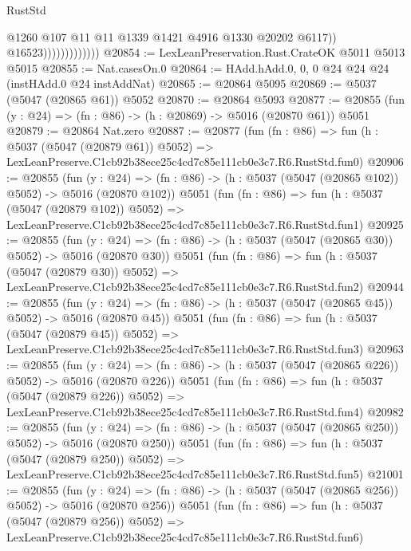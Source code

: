 \begin{lexlean}{RustStd}
\begin{coremodule}
                                  @1260
                                  @107
                                  @11
                                  @11
                                  @1339
                                  @1421
                                  @4916
                                  @1330
                                  @20202
                                  @6117))
                              @16523)))))))))))))
@20854 := LexLeanPreservation.Rust.CrateOK @5011 @5013 @5015
@20855 := Nat.casesOn.{0}
@20864 := HAdd.hAdd.{0, 0, 0} @24 @24 @24 (instHAdd.{0} @24 instAddNat)
@20865 := @20864 @5095
@20869 := @5037 (@5047 (@20865 @61)) @5052
@20870 := @20864 @5093
@20877 := @20855 (fun (y : @24) => (fn : @86) -> (h : @20869) -> @5016 (@20870 @61)) @5051
@20879 := @20864 Nat.zero
@20887 := @20877
    (fun (fn : @86) =>
    fun (h : @5037 (@5047 (@20879 @61)) @5052) =>
    LexLeanPreserve.C1cb92b38ece25c4cd7c85e111cb0e3c7.R6.RustStd.fun0)
@20906 := @20855
    (fun (y : @24) => (fn : @86) -> (h : @5037 (@5047 (@20865 @102)) @5052) -> @5016 (@20870 @102))
    @5051
    (fun (fn : @86) =>
    fun (h : @5037 (@5047 (@20879 @102)) @5052) =>
    LexLeanPreserve.C1cb92b38ece25c4cd7c85e111cb0e3c7.R6.RustStd.fun1)
@20925 := @20855
    (fun (y : @24) => (fn : @86) -> (h : @5037 (@5047 (@20865 @30)) @5052) -> @5016 (@20870 @30))
    @5051
    (fun (fn : @86) =>
    fun (h : @5037 (@5047 (@20879 @30)) @5052) =>
    LexLeanPreserve.C1cb92b38ece25c4cd7c85e111cb0e3c7.R6.RustStd.fun2)
@20944 := @20855
    (fun (y : @24) => (fn : @86) -> (h : @5037 (@5047 (@20865 @45)) @5052) -> @5016 (@20870 @45))
    @5051
    (fun (fn : @86) =>
    fun (h : @5037 (@5047 (@20879 @45)) @5052) =>
    LexLeanPreserve.C1cb92b38ece25c4cd7c85e111cb0e3c7.R6.RustStd.fun3)
@20963 := @20855
    (fun (y : @24) => (fn : @86) -> (h : @5037 (@5047 (@20865 @226)) @5052) -> @5016 (@20870 @226))
    @5051
    (fun (fn : @86) =>
    fun (h : @5037 (@5047 (@20879 @226)) @5052) =>
    LexLeanPreserve.C1cb92b38ece25c4cd7c85e111cb0e3c7.R6.RustStd.fun4)
@20982 := @20855
    (fun (y : @24) => (fn : @86) -> (h : @5037 (@5047 (@20865 @250)) @5052) -> @5016 (@20870 @250))
    @5051
    (fun (fn : @86) =>
    fun (h : @5037 (@5047 (@20879 @250)) @5052) =>
    LexLeanPreserve.C1cb92b38ece25c4cd7c85e111cb0e3c7.R6.RustStd.fun5)
@21001 := @20855
    (fun (y : @24) => (fn : @86) -> (h : @5037 (@5047 (@20865 @256)) @5052) -> @5016 (@20870 @256))
    @5051
    (fun (fn : @86) =>
    fun (h : @5037 (@5047 (@20879 @256)) @5052) =>
    LexLeanPreserve.C1cb92b38ece25c4cd7c85e111cb0e3c7.R6.RustStd.fun6)

\end{coremodule}
\end{lexlean}
